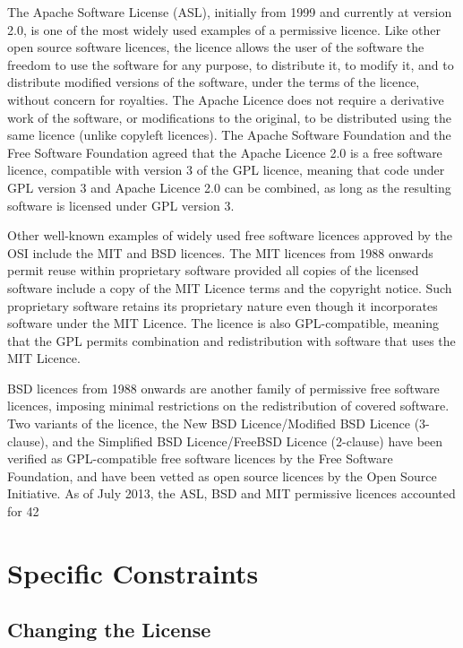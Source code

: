 \documentclass[12pt,a4paper]{article}
\begin{document}
The Apache Software License (ASL), initially from 1999 and currently at version 2.0, is one of the most widely used examples of a permissive licence. Like other open source software licences, the licence allows the user of the software the freedom to use the software for any purpose, to distribute it, to modify it, and to distribute modified versions of the software, under the terms of the licence, without concern for royalties.  The Apache Licence does not require a derivative work of the software, or modifications to the original, to be distributed using the same licence (unlike copyleft licences). The Apache Software Foundation and the Free Software Foundation agreed that the Apache Licence 2.0 is a free software licence, compatible with version 3 of the GPL licence, meaning that code under GPL version 3 and Apache Licence 2.0 can be combined, as long as the resulting software is licensed under GPL version 3. 

Other well-known examples of widely used free software licences approved by the OSI include the MIT and BSD licences. The MIT licences from 1988 onwards permit reuse within proprietary software provided all copies of the licensed software include a copy of the MIT Licence terms and the copyright notice. Such proprietary software retains its proprietary nature even though it incorporates software under the MIT Licence. The licence is also GPL-compatible, meaning that the GPL permits combination and redistribution with software that uses the MIT Licence. 

BSD licences from 1988 onwards are another family of permissive free software licences, imposing minimal restrictions on the redistribution of covered software. Two variants of the licence, the New BSD Licence/Modified BSD Licence (3-clause), and the Simplified BSD Licence/FreeBSD Licence (2-clause) have been verified as GPL-compatible free software licences by the Free Software Foundation, and have been vetted as open source licences by the Open Source Initiative.
As of July 2013, the ASL, BSD and MIT permissive licences accounted for 42%

\section{Specific Constraints}
\label{sec:SpecificConstraints}

\subsection{Changing the License}
\label{sec:LicenseChange}
\end{document}
